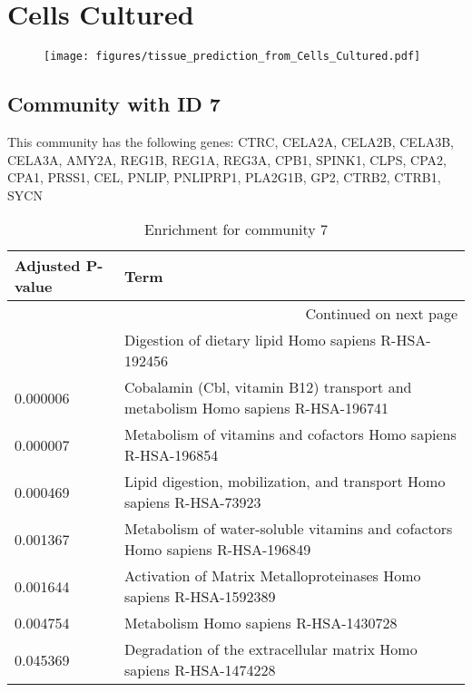 
\section*{Cells Cultured}
\begin{figure}[h!]
\centering
\texttt{[image: figures/tissue\_prediction\_from\_Cells\_Cultured.pdf]}
\end{figure}



\subsection*{Community with ID 7}
This community has the following genes: CTRC, CELA2A, CELA2B, CELA3B, CELA3A, AMY2A, REG1B, REG1A, REG3A, CPB1, SPINK1, CLPS, CPA2, CPA1, PRSS1, CEL, PNLIP, PNLIPRP1, PLA2G1B, GP2, CTRB2, CTRB1, SYCN
\\
\begin{longtable}{p{2.4cm}p{14.5cm}}
\caption{Enrichment for community 7}\\
\toprule
Adjusted \newline P-value &                                                                             Term \\
\midrule
\endhead
\midrule
\multicolumn{2}{r}{{Continued on next page}} \\
\midrule
\endfoot

\bottomrule
\endlastfoot
                 0.000005 &                             Digestion of dietary lipid Homo sapiens R-HSA-192456 \\
                 0.000006 &  Cobalamin (Cbl, vitamin B12) transport and metabolism Homo sapiens R-HSA-196741 \\
                 0.000007 &                   Metabolism of vitamins and cofactors Homo sapiens R-HSA-196854 \\
                 0.000469 &            Lipid digestion, mobilization, and transport Homo sapiens R-HSA-73923 \\
                 0.001367 &     Metabolism of water-soluble vitamins and cofactors Homo sapiens R-HSA-196849 \\
                 0.001644 &               Activation of Matrix Metalloproteinases Homo sapiens R-HSA-1592389 \\
                 0.004754 &                                            Metabolism Homo sapiens R-HSA-1430728 \\
                 0.045369 &               Degradation of the extracellular matrix Homo sapiens R-HSA-1474228 \\
\end{longtable}


